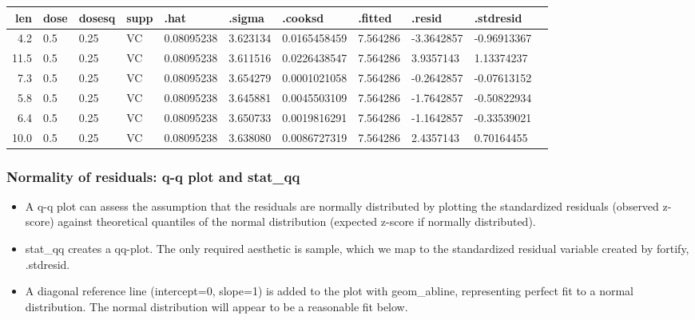 \documentclass[11pt]{article}
\begin{document}
    \begin{tabular}{r|llllllllll}
 len & dose & dosesq & supp & .hat & .sigma & .cooksd & .fitted & .resid & .stdresid\\
\hline
	  4.2         & 0.5          & 0.25         & VC           & 0.08095238   & 3.623134     & 0.0165458459 & 7.564286     & -3.3642857   & -0.96913367 \\
	 11.5         & 0.5          & 0.25         & VC           & 0.08095238   & 3.611516     & 0.0226438547 & 7.564286     &  3.9357143   &  1.13374237 \\
	  7.3         & 0.5          & 0.25         & VC           & 0.08095238   & 3.654279     & 0.0001021058 & 7.564286     & -0.2642857   & -0.07613152 \\
	  5.8         & 0.5          & 0.25         & VC           & 0.08095238   & 3.645881     & 0.0045503109 & 7.564286     & -1.7642857   & -0.50822934 \\
	  6.4         & 0.5          & 0.25         & VC           & 0.08095238   & 3.650733     & 0.0019816291 & 7.564286     & -1.1642857   & -0.33539021 \\
	 10.0         & 0.5          & 0.25         & VC           & 0.08095238   & 3.638080     & 0.0086727319 & 7.564286     &  2.4357143   &  0.70164455 \\
\end{tabular}


    
    \subsubsection{Normality of residuals: q-q plot and
stat\_qq}\label{normality-of-residuals-q-q-plot-and-statux5fqq}

\begin{itemize}
\item
  A q-q plot can assess the assumption that the residuals are normally
  distributed by plotting the standardized residuals (observed z-score)
  against theoretical quantiles of the normal distribution (expected
  z-score if normally distributed).
\item
  stat\_qq creates a qq-plot. The only required aesthetic is sample,
  which we map to the standardized residual variable created by fortify,
  .stdresid.
\item
  A diagonal reference line (intercept=0, slope=1) is added to the plot
  with geom\_abline, representing perfect fit to a normal distribution.
  The normal distribution will appear to be a reasonable fit below.
\end{itemize}
\end{document}
